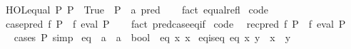 \begin{isabellebody}
\ \ {\isachardoublequoteopen}HOL{\isachardot}{\kern0pt}equal\ P\ P\ {\isasymlongleftrightarrow}\ True{\isachardoublequoteclose}\ \ P\ {\isacharcolon}{\kern0pt}{\isacharcolon}{\kern0pt}\ {\isachardoublequoteopen}{\isacharprime}{\kern0pt}a\ pred{\isachardoublequoteclose}\isanewline
%
\isadelimproof
\ \ %
\endisadelimproof
%
\isatagproof
{}\isamarkupfalse%
\ {\isacharparenleft}{\kern0pt}fact\ equal{\isacharunderscore}{\kern0pt}refl{\isacharparenright}{\kern0pt}%
\endisatagproof
{\isafoldproof}%
%
\isadelimproof
\isanewline
%
\endisadelimproof
\isanewline
{}\isamarkupfalse%
\ {\isacharbrackleft}{\kern0pt}code{\isacharbrackright}{\kern0pt}{\isacharcolon}{\kern0pt}\isanewline
\ \ {\isachardoublequoteopen}case{\isacharunderscore}{\kern0pt}pred\ f\ P\ {\isacharequal}{\kern0pt}\ f\ {\isacharparenleft}{\kern0pt}eval\ P{\isacharparenright}{\kern0pt}{\isachardoublequoteclose}\isanewline
%
\isadelimproof
\ \ %
\endisadelimproof
%
\isatagproof
{}\isamarkupfalse%
\ {\isacharparenleft}{\kern0pt}fact\ pred{\isachardot}{\kern0pt}case{\isacharunderscore}{\kern0pt}eq{\isacharunderscore}{\kern0pt}if{\isacharparenright}{\kern0pt}%
\endisatagproof
{\isafoldproof}%
%
\isadelimproof
\isanewline
%
\endisadelimproof
\isanewline
{}\isamarkupfalse%
\ {\isacharbrackleft}{\kern0pt}code{\isacharbrackright}{\kern0pt}{\isacharcolon}{\kern0pt}\isanewline
\ \ {\isachardoublequoteopen}rec{\isacharunderscore}{\kern0pt}pred\ f\ P\ {\isacharequal}{\kern0pt}\ f\ {\isacharparenleft}{\kern0pt}eval\ P{\isacharparenright}{\kern0pt}{\isachardoublequoteclose}\isanewline
%
\isadelimproof
\ \ %
\endisadelimproof
%
\isatagproof
{}\isamarkupfalse%
\ {\isacharparenleft}{\kern0pt}cases\ P{\isacharparenright}{\kern0pt}\ simp%
\endisatagproof
{\isafoldproof}%
%
\isadelimproof
\isanewline
%
\endisadelimproof
\isanewline
{}\isamarkupfalse%
\ eq\ {\isacharcolon}{\kern0pt}{\isacharcolon}{\kern0pt}\ {\isachardoublequoteopen}{\isacharprime}{\kern0pt}a\ {\isasymRightarrow}\ {\isacharprime}{\kern0pt}a\ {\isasymRightarrow}\ bool{\isachardoublequoteclose}\ \ {\isachardoublequoteopen}eq\ x\ x{\isachardoublequoteclose}\isanewline
\isanewline
{}\isamarkupfalse%
\ eq{\isacharunderscore}{\kern0pt}is{\isacharunderscore}{\kern0pt}eq{\isacharcolon}{\kern0pt}\ {\isachardoublequoteopen}eq\ x\ y\ {\isasymequiv}\ {\isacharparenleft}{\kern0pt}x\ {\isacharequal}{\kern0pt}\ y{\isacharparenright}{\kern0pt}{\isachardoublequoteclose}\isanewline
%
\isadelimproof
\ \ %
\endisadelimproof
%
\isatagproof

\end{isabellebody}

